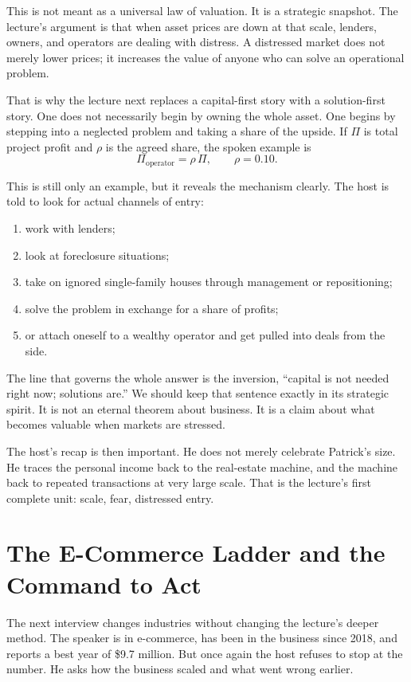 This is not meant as a universal law of valuation. It is a strategic snapshot. The lecture's argument is that when asset prices are down at that scale, lenders, owners, and operators are dealing with distress. A distressed market does not merely lower prices; it increases the value of anyone who can solve an operational problem.

That is why the lecture next replaces a capital-first story with a solution-first story. One does not necessarily begin by owning the whole asset. One begins by stepping into a neglected problem and taking a share of the upside. If \(\Pi\) is total project profit and \(\rho\) is the agreed share, the spoken example is
\begin{equation}
\Pi_{\mathrm{operator}} = \rho\,\Pi,\qquad \rho = 0.10.
\end{equation}

This is still only an example, but it reveals the mechanism clearly. The host is told to look for actual channels of entry:
\begin{enumerate}
\item work with lenders;
\item look at foreclosure situations;
\item take on ignored single-family houses through management or repositioning;
\item solve the problem in exchange for a share of profits;
\item or attach oneself to a wealthy operator and get pulled into deals from the side.
\end{enumerate}

The line that governs the whole answer is the inversion, ``capital is not needed right now; solutions are.'' We should keep that sentence exactly in its strategic spirit. It is not an eternal theorem about business. It is a claim about what becomes valuable when markets are stressed.

The host's recap is then important. He does not merely celebrate Patrick's size. He traces the personal income back to the real-estate machine, and the machine back to repeated transactions at very large scale. That is the lecture's first complete unit: scale, fear, distressed entry.

\section{The E-Commerce Ladder and the Command to Act}

The next interview changes industries without changing the lecture's deeper method. The speaker is in e-commerce, has been in the business since 2018, and reports a best year of \$9.7 million. But once again the host refuses to stop at the number. He asks how the business scaled and what went wrong earlier.

